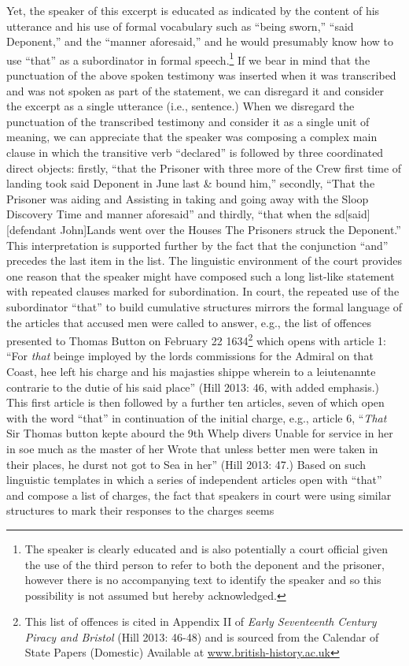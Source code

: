 \documentclass[12pt]{article}
\newcommand\textstyleInternetlink[1]{#1}
\newenvironment{styleStandard}{\renewcommand\baselinestretch{1.0}\setlength\leftskip{0cm}\setlength\rightskip{0cm plus 1fil}\setlength\parindent{0cm}\setlength\parfillskip{0pt plus 1fil}\setlength\parskip{0in plus 1pt}\writerlistparindent\writerlistleftskip\leavevmode\normalfont\normalsize\writerlistlabel\ignorespaces}{\unskip\vspace{0in plus 1pt}\par}
\newcommand\writerlistleftskip{}
\newcommand\writerlistparindent{}
\newcommand\writerlistlabel{}
\begin{document}
\begin{styleStandard}
Yet, the speaker of this excerpt is educated as indicated by the content of his utterance and his use of formal vocabulary such as “being sworn,” “said Deponent,” and the “manner aforesaid,” and he would presumably know how to use “that” as a subordinator in formal speech.\footnote{ The speaker is clearly educated and is also potentially a court official given the use of the third person to refer to both the deponent and the prisoner, however there is no accompanying text to identify the speaker and so this possibility is not assumed but hereby acknowledged.} If we bear in mind that the punctuation of the above spoken testimony was inserted when it was transcribed and was not spoken as part of the statement, we can disregard it and consider the excerpt as a single utterance (i.e., sentence.) When we disregard the punctuation of the transcribed testimony and consider it as a single unit of meaning, we can appreciate that the speaker was composing a complex main clause in which the transitive verb “declared” is followed by three coordinated direct objects: firstly, “that\textit{ }the Prisoner with three more of the Crew first time of landing took said Deponent in June last \& bound him,” secondly, “That the Prisoner was aiding and Assisting in taking and going away with the Sloop Discovery Time and manner aforesaid” and thirdly, “that when the sd[said] [defendant John]Lands went over the Houses The Prisoners struck the Deponent.” This interpretation is supported further by the fact that the conjunction “and” precedes the last item in the list. The linguistic environment of the court provides one reason that the speaker might have composed such a long list-like statement with repeated clauses marked for subordination. In court, the repeated use of the subordinator “that” to build cumulative structures mirrors the formal language of the articles that accused men were called to answer, e.g., the list of offences presented to Thomas Button on February 22 1634\footnote{ This list of offences is cited in Appendix II of \textit{Early Seventeenth Century Piracy and Bristol} (Hill 2013: 46-48) and is sourced from the Calendar of State Papers (Domestic) Available at \href{http://www.british-history.ac.uk/}{\textstyleInternetlink{www.british-history.ac.uk}}\par } which opens with article 1: “For\textit{ that} beinge imployed by the lords commissions for the Admiral on that Coast, hee left his charge and his majasties shippe wherein to a leiutenannte contrarie to the dutie of his said place” (Hill 2013: 46, with added emphasis.) This first article is then followed by a further ten articles, seven of which open with the word “that” in continuation of the initial charge, e.g., article 6, “\textit{That }Sir Thomas button kepte abourd the 9th Whelp divers Unable for service in her in soe much as the master of her Wrote that unless better men were taken in their places, he durst not got to Sea in her” (Hill 2013: 47.) Based on such linguistic templates in which a series of independent articles open with “that” and compose a list of charges, the fact that speakers in court were using similar structures to mark their responses to the charges seems 
\end{styleStandard}
\end{document}
